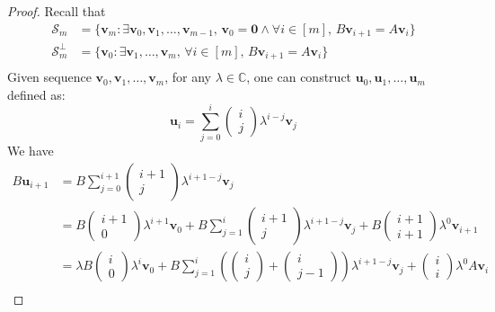 \documentclass{article}
\newcommand{\0}{\mathbf{0}}
\renewcommand{\vec}{\mathbf}
\newcommand{\vv}{\vec{v}}
\newcommand{\vu}{\vec{u}}
\newcommand{\C}{\mathbb{C}}
\newcommand{\vecspace}[1]{\mathcal{#1}}
\newcommand{\vsS}{\vecspace{S}}
\newcommand{\vsSp}{\vecspace{S}^\perp}
\begin{document}
\begin{proof}
    Recall that
    \begin{align*}
        \vsS_m &= \{\vv_m:\exists \vv_0, \vv_1, \dots, \vv_{m-1},\,\vv_0=\0\land\forall i\in[m],\,B\vv_{i+1}=A\vv_i\}\\
        \vsSp_m &= \{\vv_0:\exists \vv_1, \dots, \vv_m,\,\forall i\in[m],\,B\vv_{i+1}=A\vv_i\}\\
    \end{align*}
    Given sequence $\vv_0,\vv_1,\dots,\vv_m$, for any $\lambda\in\C$, one can construct $\vu_0,\vu_1,\dots,\vu_m$ defined as:
    \begin{equation*}
        \vu_i = \sum_{j=0}^{i}\begin{pmatrix}i\\j\end{pmatrix}\lambda^{i-j}\vv_j
    \end{equation*}
    We have
    \begin{align*}
        B\vu_{i+1}
        &=B\sum_{j=0}^{i+1}\begin{pmatrix}i+1\\j\end{pmatrix}\lambda^{i+1-j}\vv_j\\
        &=B\begin{pmatrix}i+1\\0\end{pmatrix}\lambda^{i+1}\vv_0+B\sum_{j=1}^{i}\begin{pmatrix}i+1\\j\end{pmatrix}\lambda^{i+1-j}\vv_j+B\begin{pmatrix}i+1\\i+1\end{pmatrix}\lambda^{0}\vv_{i+1}\\
        &=\lambda B\begin{pmatrix}i\\0\end{pmatrix}\lambda^{i}\vv_0+B\sum_{j=1}^{i}\left(\begin{pmatrix}i\\j\end{pmatrix}+\begin{pmatrix}i\\j-1\end{pmatrix}\right)\lambda^{i+1-j}\vv_j+\begin{pmatrix}i\\i\end{pmatrix}\lambda^{0}A\vv_{i}\\

\end{align*}
\end{proof}
\end{document}
